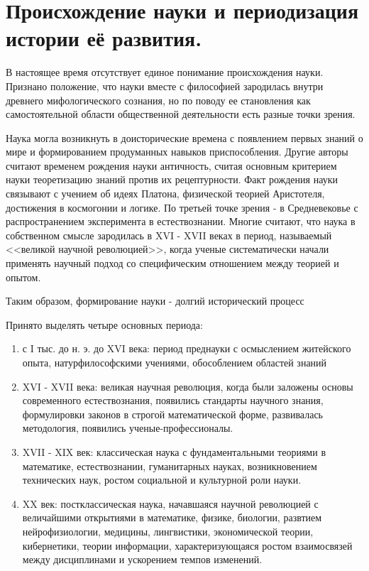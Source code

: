 \documentclass[12pt, specialist, subf, substylefile = spbu.rtx]{disser}
\begin{document}
\section{Происхождение науки и периодизация истории её развития.}
В настоящее время отсутствует единое понимание происхождения науки. Признано положение, что науки вместе с философией зародилась внутри древнего мифологического сознания, но по поводу ее становления как самостоятельной области общественной деятельности есть разные точки зрения.

Наука могла возникнуть в доисторические времена с появлением первых знаний о мире и формированием продуманных навыков приспособления. Другие авторы считают временем рождения науки античность, считая основным критерием науки теоретизацию знаний против их рецептурности. Факт рождения науки связывают с учением об идеях Платона, физической теорией Аристотеля, достижения в космогонии и логике. По третьей точке зрения - в Средневековье с распространением эксперимента в естествознании. Многие считают, что наука в собственном смысле зародилась в XVI - XVII веках в период, называемый <<великой научной революцией>>, когда ученые систематически начали применять научный подход со специфическим отношением между теорией и опытом.

Таким образом, формирование науки - долгий исторический процесс

Принято выделять четыре основных периода:
\begin{enumerate}
	\item с I тыс. до н. э. до XVI века: период преднауки с осмыслением житейского опыта, натурфилософскими учениями, обособлением областей знаний
	\item XVI - XVII века: великая научная революция, когда были заложены основы современного естествознания, появились стандарты научного знания, формулировки законов в строгой математической форме, развивалась методология, появились ученые-профессионалы.
	\item XVII - XIX век: классическая наука с фундаментальными теориями в математике, естествознании, гуманитарных науках, возникновением технических наук, ростом социальной и культурной роли науки.
	\item XX век: постклассическая наука, начавшаяся научной революцией с величайшими открытиями в математике, физике, биологии, развтием нейрофизиологии, медицины, лингвистики, экономической теории, кибернетики, теории информации, характеризующаяся ростом взаимосвязей между дисциплинами и ускорением темпов изменений.
\end{enumerate}
\end{document}
